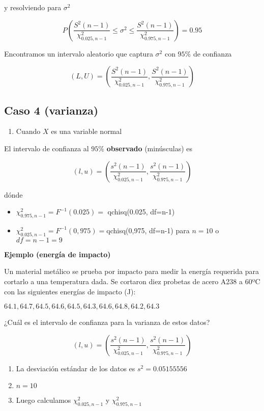 \documentclass[
]{book}
\providecommand{\tightlist}{%
  \setlength{\itemsep}{0pt}\setlength{\parskip}{0pt}}
\begin{document}
y resolviendo para \(\sigma^2\)

\[P(\frac{S^2 (n-1)}{\chi^2_{0.025,n-1}}\leq \sigma^2 \leq \frac{S^2(n-1)}{ \chi^2_{0.975,n-1}})=0.95\]

Encontramos un intervalo aleatorio que captura \(\sigma^2\)
con \(95\%\) de confianza

\[(L,U) = (\frac{S^2 (n-1)}{\chi^2_{0.025,n-1}},\frac{S^2(n-1)}{\chi ^2_{0.975,n-1}})\]

\hypertarget{caso-4-varianza}{%
\subsection{Caso 4 (varianza)}\label{caso-4-varianza}}

\begin{enumerate}
\def\labelenumi{\arabic{enumi}.}
\tightlist
\item
  Cuando \(X\) es una variable normal
\end{enumerate}

El intervalo de confianza al \(95\%\) \textbf{observado} (minúsculas) es

\[(l,u) = (\frac{s^2 (n-1)}{\chi^2_{0.025,n-1}},\frac{s^2(n-1)}{\chi ^2_{0.975,n-1}})\]

dónde

\begin{itemize}
\item
  \(\chi^2_{0.975,n-1}=F^{-1}(0.025)=\) qchisq(0.025, df=n-1)
\item
  \(\chi^2_{0.025, n-1}=F^{-1}(0,975)=\)qchisq(0,975, df=n-1)
  para \(n=10\) o \(df=n-1=9\)
\end{itemize}

\textbf{Ejemplo (energía de impacto)}

Un material metálico se prueba por impacto para medir la energía requerida para cortarlo a una temperatura dada. Se cortaron diez probetas de acero A238 a 60ºC con las siguientes energías de impacto (J):

\(64.1, 64.7, 64.5, 64.6, 64.5, 64.3, 64.6, 64.8, 64.2, 64.3\)

¿Cuál es el intervalo de confianza para la varianza de estos datos?

\[(l,u) = (\frac{s^2 (n-1)}{\chi^2_{0.025,n-1}},\frac{s^2(n-1)}{\chi ^2_{0.975,n-1}})\]

\begin{enumerate}
\def\labelenumi{\arabic{enumi}.}
\item
  La desviación estándar de los datos es \(s^2=0.05155556\)
\item
  \(n=10\)
\item
  Luego calculamos \(\chi^2_{0.025,n-1}\) y \(\chi^2_{0.975,n-1}\)
\end{enumerate}
\end{document}
